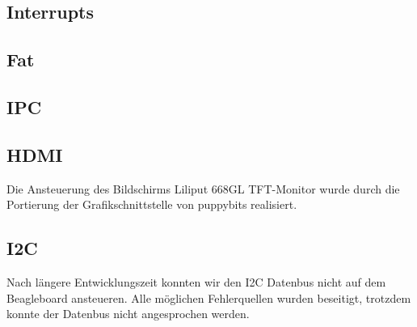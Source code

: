 \documentclass[10pt,a4paper]{article}
\begin{document}
\subsection{Interrupts}
\newpage


\subsection{Fat}

\newpage
\subsection{IPC}
\newpage
\subsection{HDMI}
Die Ansteuerung des Bildschirms Liliput 668GL TFT-Monitor wurde durch die Portierung der Grafikschnittstelle von puppybits realisiert.
\newpage
\subsection{I2C}
Nach längere Entwicklungszeit konnten wir den I2C Datenbus nicht auf dem Beagleboard ansteueren. Alle möglichen Fehlerquellen wurden beseitigt, trotzdem konnte der Datenbus nicht angesprochen werden.
\end{document}
